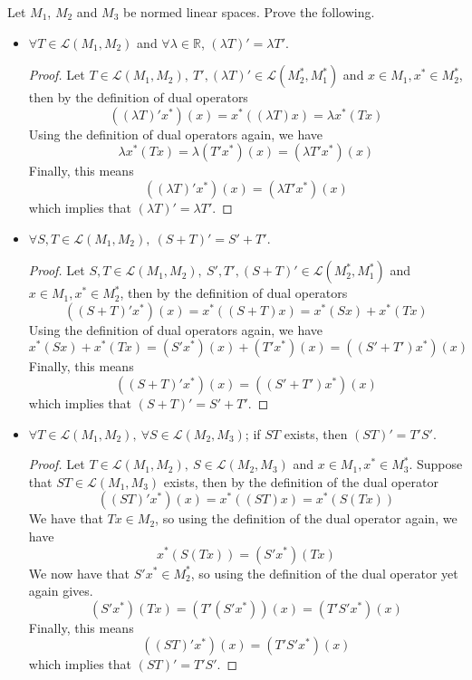 \documentclass{article}
\newcommand{\parens}[1]{\left(#1\right)}
\newcommand{\R}{\mathbb{R}}
\newcommand{\LT}{\mathcal{L}}
\begin{document}
    \item Let $M_1$, $M_2$ and $M_3$ be normed linear spaces. 
    Prove the following.
    \begin{itemize}
        \item $\forall T \in \LT\parens{M_1, M_2}$ and $\forall \lambda \in 
        \R$, $\parens{\lambda T}' = \lambda T'$.
        \begin{proof}
        Let $T \in \LT\parens{M_1, M_2},\ T', (\lambda T)' \in \LT\parens{M_2^*, M_1^*}$ 
        and $x \in M_1, x^* \in M_2^*$, then by the definition of dual operators
        $$\parens{(\lambda T)'x^*}(x) = x^*\parens{(\lambda T)x} = \lambda
        x^*(Tx)$$
        Using the definition of dual operators again, we have
        $$\lambda x^*(Tx) = \lambda \parens{T'x^*}(x) = 
        \parens{\lambda T'x^*}(x)$$
        Finally, this means
        $$\parens{(\lambda T)'x^*}(x) = \parens{\lambda T'x^*}(x)$$
        which implies that $\parens{\lambda T}' = \lambda T'$.
        \end{proof}

        \item $\forall S, T \in \LT\parens{M_1, M_2},\ \parens{S+T}' = 
        S'+T'$.
        \begin{proof}
        Let $S,T \in \LT\parens{M_1, M_2},\ S',T',(S+T)' \in \LT\parens{M_2^*,M_1^*}$ 
        and $x\in M_1, x^* \in M_2^*$, then by the definition of dual operators
        $$\parens{(S + T)'x^*}(x) = x^*\parens{(S + T)x} = x^*(Sx) + x^*(Tx)$$
        Using the definition of dual operators again, we have
        $$x^*(Sx) + x^*(Tx) = \parens{S'x^*}(x) + \parens{T'x^*}(x) = 
        \parens{(S' + T')x^*}(x)$$
        Finally, this means
        $$\parens{(S+ T)'x^*}(x) = \parens{(S' + T')x^*}(x)$$
        which implies that $\parens{S + T}' = S' + T'$.
        \end{proof}
        
        \item $\forall T \in \LT\parens{M_1, M_2},\ \forall S \in 
        \LT\parens{M_2, M_3}$; if $ST$ exists, then $\parens{ST}' = T'S'$.
        \begin{proof}
        Let $T \in \LT\parens{M_1, M_2},\ S \in \LT\parens{M_2, M_3}$ and 
        $x \in M_1, x^* \in M_3^*$.
        Suppose that $ST \in \LT\parens{M_1, M_3}$ exists, 
        then by the definition of the dual operator
        $$\parens{(ST)'x^*}(x) = x^*\parens{(ST)x} = x^*\parens{S(Tx)}$$
        We have that $Tx \in M_2$, so using the definition of the dual 
        operator again, we have 
        $$x^*\parens{S(Tx)} = \parens{S'x^*}(Tx)$$
        We now have that $S'x^* \in M_2^*$, so using the definition of the 
        dual operator yet again gives. 
        $$\parens{S'x^*}(Tx) = \parens{T'(S'x^*)}(x) = \parens{T'S'x^*}(x)$$
        Finally, this means 
        $$\parens{(ST)'x^*}(x) = \parens{T'S'x^*}(x)$$
        which implies that $\parens{ST}' = T'S'$.
        \end{proof}


\end{itemize}
\end{document}
